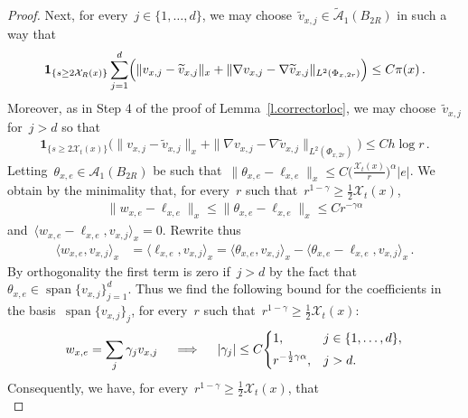 \documentclass[11pt,twoside]{article} %
\numberwithin{equation}{section}
\theoremstyle{definition}
\let\originalleft\left
\let\originalright\right
\renewcommand{\left}{\mathopen{}\mathclose\bgroup\originalleft}
\renewcommand{\right}{\aftergroup\egroup\originalright}
\renewcommand*{\tilde}{\widetilde}
\newcommand{\X}{\mathcal{X}}
\newcommand{\indc}{\boldsymbol{1}}
\DeclareMathOperator{\spn}{span}
\newcommand{\A}{\mathcal{A}}
\begin{document}
\begin{proof}
\smallskip

Next, for every~$j \in \{1,\ldots,d \}$, we may choose~$\tilde v_{x,j} \in \tilde{\A}_1(B_{2R})$ in such a way that 
\begin{align*}  
\indc_{\{ s \geq 2\X_R(x) \}}  
\sum_{j=1}^d \Bigl( 
\| v_{x,j} - \tilde v_{x,j} \|_x 
+
\| \nabla v_{x,j} - \nabla \tilde v_{x,j} \|_{L^2(\Phi_{x,2r})}
\Bigr)
\leq 
C \pi(x) 
\,.
\end{align*}
Moreover, as in Step 4 of the proof of Lemma~\ref{l.correctorloc}, we may choose~$\tilde v_{x,j}$ for~$j>d$ so that 
\begin{align}  \label{e.Malliavin.basebound}
\indc_{\{ s \geq 2\X_t(x) \}}  
\bigl( 
\| v_{x,j} - \tilde v_{x,j} \|_x 
+ 
\| \nabla v_{x,j} - \nabla \tilde v_{x,j} \|_{L^2(\Phi_{x,2r})}  
\bigr)
\leq 
C h \log r
\,.
\end{align}
Letting~$\theta_{x,e} \in \A_1(B_{2R})$ be such that~$\| \theta_{x,e} - \ell_{x,e} \|_x \leq C \bigl(\frac{\X_t(x)}{r} \Bigr)^{\! \alpha}|e|$. We obtain by the minimality that, for every~$r$ such that~$r^{1-\gamma} \geq \frac12 \X_t(x)$,
\begin{align}  \label{e.Malliavin.evenmoresilly}
 \| w_{x,e} - \ell_{x,e}  \|_x  \leq  \| \theta_{x,e} - \ell_{x,e}  \|_x \leq C r^{-\gamma \alpha}
\end{align}
and~$\langle w_{x,e} - \ell_{x,e}  , v_{x,j}  \rangle_x  = 0$. Rewrite thus 
\begin{align*}  
\langle w_{x,e}  , v_{x,j}  \rangle_x 
& = 
\langle \ell_{x,e}  , v_{x,j}  \rangle_x
= \langle \theta_{x,e} , v_{x,j}  \rangle_x 
- \langle \theta_{x,e} - \ell_{x,e}  , v_{x,j}  \rangle_x 
\,.
\end{align*}
By orthogonality the first term is zero if~$j>d$ by the fact that~$\theta_{x,e} \in \spn \{v_{x,j}\}_{j=1}^d$. Thus we find the following bound for the coefficients in the basis~$\spn \{v_{x,j}\}_{j}$,  for every~$r$ such that~$r^{1-\gamma} \geq \frac12 \X_t(x)$:
\begin{equation*}  
w_{x,e} = \sum_{j} \gamma_j  v_{x,j} 
\quad \implies \quad 
| \gamma_j | 
\leq 
C \left\{
\begin{aligned}
& 1
, & &
j \in \{1,\ldots,d\},
\\ 
& r^{-\frac12 \gamma \alpha}, & & j > d . 
\end{aligned}
\right.
\end{equation*}
Consequently, we have, for every~$r^{1-\gamma} \geq \frac12 \X_t(x)$, that 
\begin{equation}  \label{e.Malliavin.silly}

\end{equation}
\end{proof}
\end{document}
